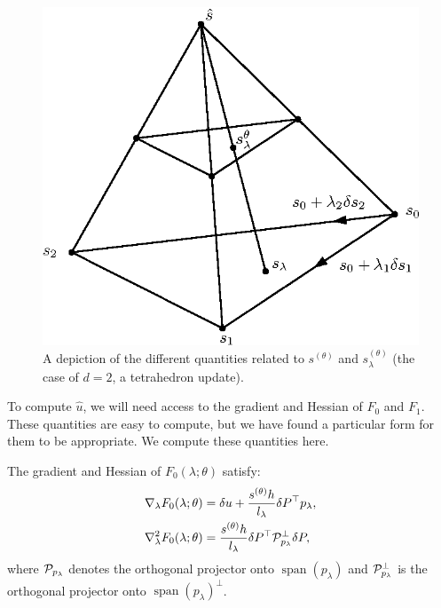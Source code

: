 \documentclass[eikonal.tex]{subfiles}
\begin{document}
\begin{figure}
  \centering
  \includegraphics{speed-tetra.eps}
  \caption{A depiction of the different quantities related to
    $s^{(\theta)}$ and $s^{(\theta)}_\lambda$ (the case of $d = 2$, a
    tetrahedron update).}
\end{figure}

To compute $\hat{u}$, we will need access to the gradient and Hessian
of $F_0$ and $F_1$. These quantities are easy to compute, but we have
found a particular form for them to be appropriate. We compute these
quantities here.

\begin{lemma}\label{lemma:F0-grad-and-Hess}
  The gradient and Hessian of $F_0(\lambda; \theta)$ satisfy:
  \begin{align}
    \nabla_\lambda F_0(\lambda; \theta) &= \delta u + \frac{s^{(\theta)} h}{l_\lambda} \delta P^\top p_\lambda, \\
    \nabla^2_\lambda F_0(\lambda; \theta) &= \frac{s^{(\theta)} h}{l_\lambda} \delta P^\top \mathcal{P}^\perp_{p_\lambda} \delta P,
  \end{align}
  where $\mathcal{P}_{p_\lambda}$ denotes the orthogonal projector onto
  $\operatorname{span}(p_\lambda)$ and $\mathcal{P}_{p_\lambda}^\perp$ is
  the orthogonal projector onto
  $\operatorname{span}(p_\lambda)^\perp$.
\end{lemma}
\end{document}
